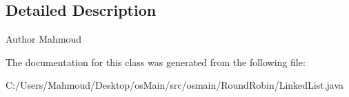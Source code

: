 \subsection{Detailed Description}
\begin{DoxyAuthor}{Author}
Mahmoud 
\end{DoxyAuthor}


The documentation for this class was generated from the following file\+:\begin{DoxyCompactItemize}
\item 
C\+:/\+Users/\+Mahmoud/\+Desktop/os\+Main/src/osmain/\+Round\+Robin/Linked\+List.\+java\end{DoxyCompactItemize}
